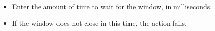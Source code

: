 \begin{itemize}
\item Enter the amount of time to wait for the window, in milliseconds.
\item If the window does not close in this time, the action fails.
\end{itemize}

